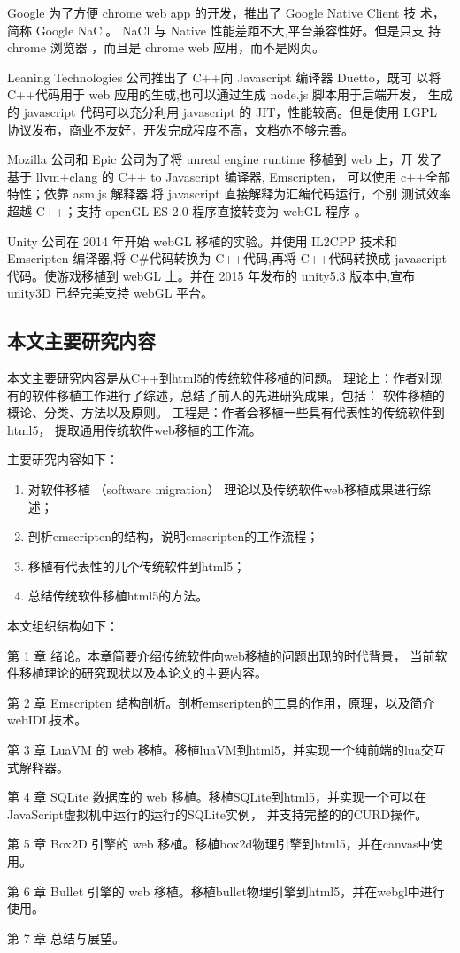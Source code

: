 Google 为了方便 chrome web app 的开发，推出了 Google Native Client 技
术，简称 Google NaCl。
NaCl 与 Native 性能差距不大,平台兼容性好。但是只支
持 chrome 浏览器 ，而且是 chrome web 应用，而不是网页。

Leaning Technologies 公司推出了 C++向 Javascript 编译器 Duetto，既可
以将 C++代码用于 web 应用的生成,也可以通过生成 node.js 脚本用于后端开发，
生成的 javascript 代码可以充分利用 javascript 的 JIT，性能较高。但是使用
LGPL 协议发布，商业不友好，开发完成程度不高，文档亦不够完善。

Mozilla 公司和 Epic 公司为了将 unreal engine runtime 移植到 web 上，开
发了基于 llvm+clang 的 C++ to Javascript 编译器, Emscripten，
可以使用 c++全部特性；依靠 asm.js 解释器,将 javascript 直接解释为汇编代码运行，个别
测试效率超越 C++；支持 openGL ES 2.0 程序直接转变为 webGL 程序 。

Unity 公司在 2014 年开始 webGL 移植的实验。并使用 IL2CPP 技术和 Emscripten 编译器,将 C\#代码转换为 C++代码,再将 C++代码转换成 javascript 代码。使游戏移植到 webGL 上。并在 2015 年发布的 unity5.3 版本中,宣布 unity3D 已经完美支持 webGL 平台。


\subsection{本文主要研究内容}

本文主要研究内容是从C++到html5的传统软件移植的问题。
理论上：作者对现有的软件移植工作进行了综述，总结了前人的先进研究成果，包括：
软件移植的概论、分类、方法以及原则。
工程是：作者会移植一些具有代表性的传统软件到html5，
提取通用传统软件web移植的工作流。

主要研究内容如下：

\begin{enumerate}[itemindent=2em]
    \item 对软件移植 （software migration） 理论以及传统软件web移植成果进行综述；
    \item 剖析emscripten的结构，说明emscripten的工作流程；
    \item 移植有代表性的几个传统软件到html5；
    \item 总结传统软件移植html5的方法。
\end{enumerate}

本文组织结构如下：

{\heiti 第 1 章 } 绪论。本章简要介绍传统软件向web移植的问题出现的时代背景，
当前软件移植理论的研究现状以及本论文的主要内容。

{\heiti 第 2 章 } Emscripten 结构剖析。剖析emscripten的工具的作用，原理，以及简介webIDL技术。

{\heiti 第 3 章 } LuaVM 的 web 移植。移植luaVM到html5，并实现一个纯前端的lua交互式解释器。

{\heiti 第 4 章 } SQLite 数据库的 web 移植。移植SQLite到html5，并实现一个可以在JavaScript虚拟机中运行的运行的SQLite实例，
并支持完整的的CURD操作。

{\heiti 第 5 章 } Box2D 引擎的 web 移植。移植box2d物理引擎到html5，并在canvas中使用。

{\heiti 第 6 章 } Bullet 引擎的 web 移植。移植bullet物理引擎到html5，并在webgl中进行使用。

{\heiti 第 7 章 } 总结与展望。
